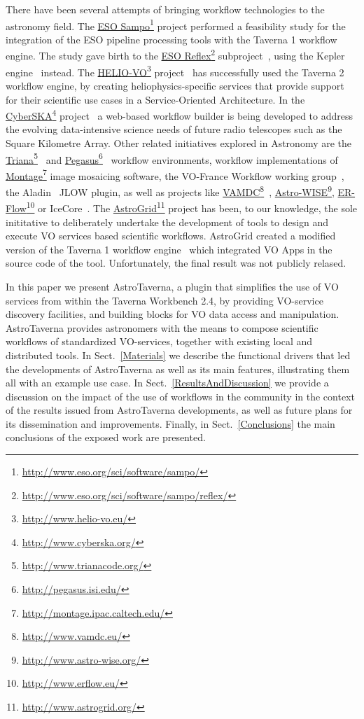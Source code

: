 \documentclass{aa}
\newcommand{\urlsamefont}[1]{\urlstyle{same}\url{#1}}
\newcommand{\hrefnote}[2]{\href{#1}{#2}\footnote{\urlsamefont{#1}}}
\begin{document}
There have been several attempts of bringing workflow technologies to the astronomy field. The \hrefnote{http://www.eso.org/sci/software/sampo/}{ESO Sampo} project performed a feasibility study for the integration of the ESO pipeline processing tools with the Taverna 1 workflow engine. The study gave birth to the \hrefnote{http://www.eso.org/sci/software/sampo/reflex/}{ESO Reflex} subproject~\citep{Hook2009}, using the Kepler engine~\citep{Altintas2004} instead. The \hrefnote{http://www.helio-vo.eu/}{HELIO-VO} project~\citep{Bentley2013} has successfully used the Taverna 2 workflow engine, by creating heliophysics-specific services that provide support for their scientific use cases in a Service-Oriented Architecture. In the \hrefnote{http://www.cyberska.org/}{CyberSKA} project~\citep{Kiddle2011} a web-based workflow builder is being developed to address the evolving data-intensive science needs of future radio telescopes such as the Square Kilometre Array. Other related initiatives explored in Astronomy are the \hrefnote{http://www.trianacode.org/}{Triana}~\citep{Taylor2007} and \hrefnote{http://pegasus.isi.edu/}{Pegasus}~\citep{Deelman:2005:PFM:1239649.1239653} workflow environments, workflow implementations of \hrefnote{http://montage.ipac.caltech.edu/}{Montage} image mosaicing software, the VO-France Workflow working group~\citep{Schaaff2008}, the Aladin~\citep{Bonnarel2000} JLOW plugin, as well as projects like \hrefnote{http://www.vamdc.eu/}{VAMDC}~\citep{Walton2011}, \hrefnote{http://www.astro-wise.org/}{Astro-WISE}, \hrefnote{http://www.erflow.eu/}{ER-Flow} or IceCore~\citep{Maisala2012}. The \hrefnote{http://www.astrogrid.org/}{AstroGrid} project has been, to our knowledge, the sole inititative to deliberately undertake the development of tools to design and execute VO services based scientific workflows. AstroGrid created a modified version of the Taverna 1 workflow engine~\citep{Benson2009, Walton2010} which integrated VO Apps in the source code of the tool. Unfortunately, the final result was not publicly relased.

In this paper we present AstroTaverna, a plugin that simplifies the use of VO services from within the Taverna Workbench 2.4, by providing VO-service discovery facilities, and building blocks for VO data access and manipulation. AstroTaverna provides astronomers with the means to compose scientific workflows of standardized VO-services, together with existing local and distributed tools. In Sect.~\ref{Materials} we describe the functional drivers that led the developments of AstroTaverna as well as its main features, illustrating them all with an example use case. In Sect.~\ref{ResultsAndDiscussion} we provide a discussion on the impact of the use of workflows in the community in the context of the results issued from AstroTaverna developments, as well as future plans for its dissemination and improvements. Finally, in Sect.~\ref{Conclusions} the main conclusions of the exposed work are presented. 
\end{document}

